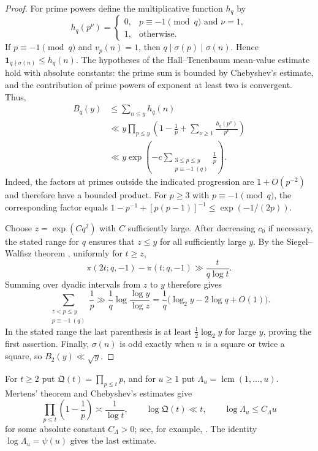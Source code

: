 \documentclass[11pt]{article}
\theoremstyle{remark}
\newcommand{\1}{\mathbf 1}
\DeclareMathOperator{\lcm}{lcm}
\begin{document}
\begin{proof}
For prime powers define the multiplicative function $h_q$ by
\[
 h_q(p^\nu)=
 \begin{cases}
  0,& p\equiv-1\pmod q\text{ and }\nu=1,\\
  1,& \text{otherwise}.
 \end{cases}
\]
If $p\equiv-1\pmod q$ and $v_p(n)=1$, then
$q\mid\sigma(p)\mid\sigma(n)$.  Hence
$\1_{q\nmid\sigma(n)}\leq h_q(n)$.  The hypotheses of the Hall--Tenenbaum mean-value estimate \cite[Theorem III.3.5]{Tenenbaum} hold with
absolute constants: the prime sum is bounded by Chebyshev's estimate, and
the contribution of prime powers of exponent at least two is convergent.
Thus,
\begin{align*}
 B_q(y)
 &\leq\sum_{n\leq y}h_q(n)\\
 &\ll y\prod_{p\leq y}
 \left(1-\frac1p+\sum_{\nu\geq1}\frac{h_q(p^\nu)}{p^\nu}\right)\\
 &\ll y\exp\!\left(
 -c\sum_{\substack{3\leq p\leq y\\p\equiv-1\ (q)}}\frac1p\right).
\end{align*}
Indeed, the factors at primes outside the indicated progression are
$1+O(p^{-2})$ and therefore have a bounded product.  For $p\geq3$ with
$p\equiv-1\pmod q$, the corresponding factor equals
$1-p^{-1}+[p(p-1)]^{-1}\leq\exp(-1/(2p))$.

Choose $z=\exp(Cq^2)$ with $C$ sufficiently large.  After decreasing
$c_0$ if necessary, the stated range for $q$ ensures that $z\leq y$ for
all sufficiently large $y$.  By the Siegel--Walfisz theorem \cite[Chapter II.8]{Tenenbaum}, uniformly for
$t\geq z$,
\[
 \pi(2t;q,-1)-\pi(t;q,-1)\gg\frac{t}{q\log t}.
\]
Summing over dyadic intervals from $z$ to $y$ therefore gives
\[
 \sum_{\substack{z<p\leq y\\p\equiv-1\ (q)}}\frac1p
 \gg \frac1q\log\frac{\log y}{\log z}
 =\frac1q\bigl(\log_2 y-2\log q+O(1)\bigr).
\]
In the stated range the last parenthesis is at least
$\tfrac12\log_2 y$ for large $y$, proving the first assertion.
Finally, $\sigma(n)$ is odd exactly when $n$ is a square or twice a square,
so $B_2(y)\ll\sqrt y$.
\end{proof}

For $t\geq2$ put $\mathfrak Q(t)=\prod_{p\leq t}p$, and for $u\geq1$ put
$\Lambda_u=\lcm(1,\ldots,u)$.  Mertens' theorem and Chebyshev's estimates give
\begin{equation}\label{eq:standard-prime-estimates}
 \prod_{p\leq t}\left(1-\frac1p\right)\asymp\frac1{\log t},
 \qquad \log\mathfrak Q(t)\ll t,
 \qquad \log\Lambda_u\leq C_\Lambda u
\end{equation}
for some absolute constant $C_\Lambda>0$; see, for example,
\cite[Chapter I.1]{Tenenbaum}.  The identity
$\log\Lambda_u=\psi(u)$ gives the last estimate.
\end{document}
